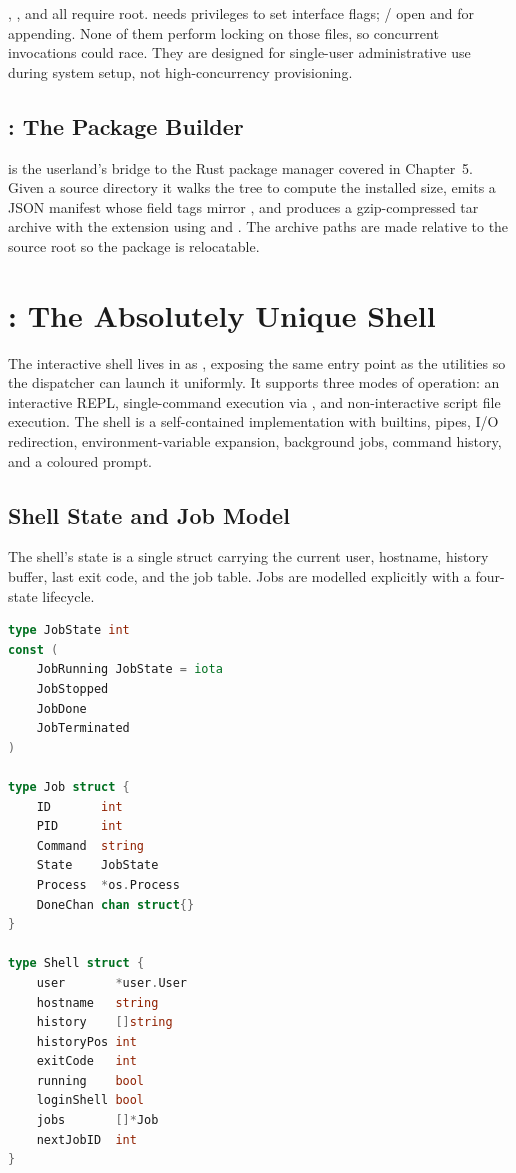 \begin{warnbox}
, , and  all require root.  needs
privileges to set interface flags; / open
 and  for appending. None of them perform
locking on those files, so concurrent invocations could race. They are designed
for single-user administrative use during system setup, not high-concurrency
provisioning.
\end{warnbox}

\subsection{: The Package Builder}

 is the userland's bridge to the Rust package manager covered in
Chapter~5. Given a source directory it walks the tree to compute the installed
size, emits a JSON manifest whose field tags mirror ,
and produces a gzip-compressed tar archive with the  extension using
 and . The archive paths are made relative
to the source root so the package is relocatable.

\section{: The Absolutely Unique Shell}

The interactive shell lives in  as ,
exposing the same  entry point as the utilities so the dispatcher
can launch it uniformly. It supports three modes of operation: an interactive
REPL, single-command execution via , and non-interactive script file
execution. The shell is a self-contained implementation with builtins, pipes, I/O
redirection, environment-variable expansion, background jobs, command history,
and a coloured prompt.

\subsection{Shell State and Job Model}

The shell's state is a single  struct carrying the current user,
hostname, history buffer, last exit code, and the job table. Jobs are modelled
explicitly with a four-state lifecycle.

\begin{lstlisting}[language=Go, caption={The job and shell state model (shell/shell.go)}]
type JobState int
const (
    JobRunning JobState = iota
    JobStopped
    JobDone
    JobTerminated
)

type Job struct {
    ID       int
    PID      int
    Command  string
    State    JobState
    Process  *os.Process
    DoneChan chan struct{}
}

type Shell struct {
    user       *user.User
    hostname   string
    history    []string
    historyPos int
    exitCode   int
    running    bool
    loginShell bool
    jobs       []*Job
    nextJobID  int
}
\end{lstlisting}

